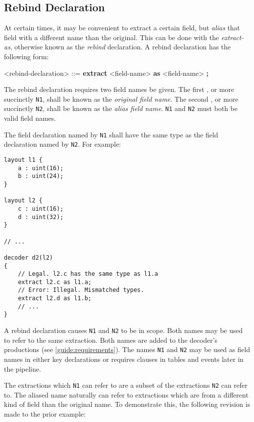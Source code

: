 \subsection{Rebind Declaration} \label{guide:rebind}

At certain times, it may be convenient to extract a certain field, but \textit{alias} that field with a different name than the original. This can be done with the \textit{extract-as}, otherwise known as the \textit{rebind} declaration. A rebind declaration has the following form:

\begin{minip}
\begin{grammar}
<rebind-declaration> ::=
\textbf{extract} <field-name> \textbf{as} <field-name> \textbf{;}
\end{grammar}
\end{minip}

The rebind declaration requires two field names be given. The first , or more succinctly \texttt{N1}, shall be known as the \textit{original field name}. The second , or more succinctly \texttt{N2}, shall be known as the \textit{alias field name}. \texttt{N1} and \texttt{N2} must both be valid field names.

The field declaration named by \texttt{N1} shall have the same type as the field declaration named by \texttt{N2}. For example:

\begin{minip}
\begin{lstlisting}
layout l1 {
	a : uint(16);
	b : uint(24);
}

layout l2 {
	c : uint(16);
	d : uint(32);
}

// ...

decoder d2(l2)
{
	// Legal. l2.c has the same type as l1.a
	extract l2.c as l1.a;
	// Error: Illegal. Mismatched types.
	extract l2.d as l1.b;
	// ...
} 
\end{lstlisting}
\end{minip}

A rebind declaration causes \texttt{N1} and \texttt{N2} to be in scope. Both names may be used to refer to the same extraction. Both names are added to the decoder's productions (see \ref{guide:requirements}). The names \texttt{N1} and \texttt{N2} may be used as field names in either key declarations or requires clauses in tables and events later in the pipeline. 

The extractions which \texttt{N1} can refer to are a subset of the extractions \texttt{N2} can refer to. The aliased name naturally can refer to extractions which are from a different kind of field than the original name. To demonstrate this, the following revision is made to the prior example:

